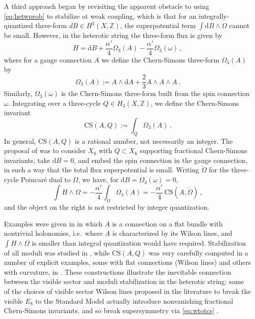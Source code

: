 \documentclass[12pt,a4wide]{article}
\def\d{\mathrm{d}}
\begin{document}
A third approach \cite{Gukov:2003cy} began by revisiting the apparent obstacle to using \eqref{eq:hetwprob} to stabilize at weak coupling, which is that for an integrally-quantized three-form $dB \in H^3(X,\mathbb{Z})$, the superpotential term $\int \d B \wedge \Omega$ cannot be small.
However, in the heterotic string the three-form flux is given by 
\begin{equation}
H = \d B + \frac{\alpha'}{4}\Omega_3(A)-\frac{\alpha'}{4}\Omega_3(\omega)\,, 
\end{equation}
where for a gauge connection $A$ we define
the Chern-Simons three-form $\Omega_3(A)$ by
\begin{equation}
\Omega_3(A):= A \wedge \d A + \frac{2}{3} A \wedge A \wedge A\,.   
\end{equation}
Similarly, $\Omega_3(\omega)$  is the Chern-Simons three-form built from the spin connection $\omega$.
Integrating over a three-cycle $Q \in H_3(X,\mathbb{Z})$, we define the Chern-Simons invariant
\begin{equation}
\text{CS}(A,Q):=\int_Q     \Omega_3(A)\,.
\end{equation}
In general, $\text{CS}(A,Q)$ is a rational number, not necessarily an integer.
The proposal of 
\cite{Gukov:2003cy}
was to consider $X_6$ with $Q \subset X_6$ supporting fractional Chern-Simons invariants, take $\d B=0$, and embed the spin connection in the gauge connection, in such a way that the total flux superpotential is small.
Writing $\check{\Omega}$ for the three-cycle Poincar\'{e} dual to $\Omega$, we have, for $\d B=\Omega_3(\omega)=0$,
\begin{equation}\label{eq:wtotcs}
\int H \wedge \Omega = -\frac{\alpha'}{4} \int_{\check{\Omega}} \Omega_3(A) = -\frac{\alpha'}{4}\,\text{CS}(A,\check{\Omega})\,,
\end{equation} and the object on the right is not restricted by integer quantization.

Examples were given in \cite{Gukov:2003cy} in which $A$ is a connection on a flat bundle with nontrivial holonomies, i.e.~where $A$ is characterized by its Wilson lines, and $\int H \wedge \Omega$ is smaller than integral quantization would have required.
Stabilization of all moduli was studied in 
\cite{Cicoli:2013rwa}, while $\text{CS}(A,Q)$ was very carefully computed in a number of explicit examples, some with flat connections (Wilson lines) and others with curvature, in \cite{Apruzzi:2014dza,Anderson:2020ebu}.
These constructions illustrate the inevitable connection between the visible sector and moduli stabilization in the heterotic string: some of the choices of visible sector Wilson lines proposed in the literature to break the visible $E_8$ to the Standard Model actually introduce nonvanishing fractional Chern-Simons invariants, and so break supersymmetry via \eqref{eq:wtotcs} \cite{Gukov:2003cy}.
 
\end{document}
